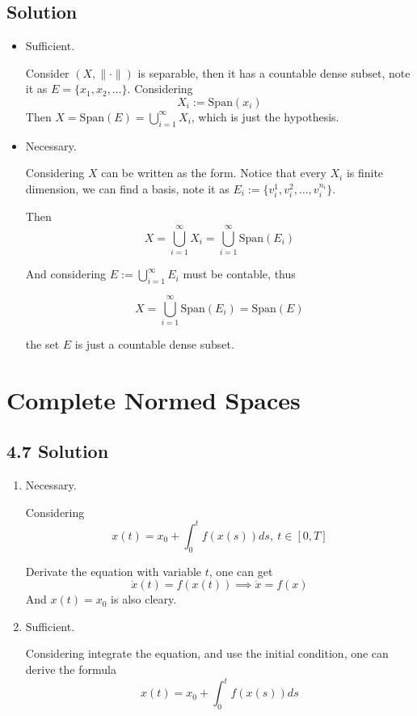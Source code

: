 \documentclass{article}
\begin{document}
\subsection{Solution}

\begin{itemize}
    \item Sufficient.
    
    Consider \((X, \|\cdot\|)\) is separable, then it has a countable dense subset, note it as \(E = \{x_1, x_2, \ldots\}\). Considering 
    \[X_i := \mathrm{Span}(x_i)\]
    Then \(X = \mathrm{Span}(E) = \bigcup_{i = 1}^\infty X_i\), which is just the hypothesis.

    \item Necessary.
    
    Considering \(X\) can be written as the form. Notice that every \(X_i\) is finite dimension, we can find a basis, note it as \(E_i := \{v_i^1, v_i^2, \ldots, v_i^{n_i}\}\). 
    
    Then
    \[X = \bigcup_{i = 1}^\infty X_i = \bigcup_{i = 1}^\infty \mathrm{Span}(E_i)\]

    And considering \(E := \bigcup_{i = 1}^\infty E_i\) must be contable, thus

    \[X = \bigcup_{i = 1}^\infty \mathrm{Span}(E_i) = \mathrm{Span}(E)\]

    the set \(E\) is just a countable dense subset.
\end{itemize}

\section{Complete Normed Spaces}

\subsection*{4.7 Solution}
\begin{enumerate}
    \item Necessary.
    
    Considering
    \[x(t) = x_0 + \int_0^t f(x(s)) ds,\ t \in [0, T]\]

    Derivate the equation with variable \(t\), one can get 
    \[\dot x(t) = f(x(t)) \implies \dot x = f(x)\]
    And \(x(t) = x_0\) is also cleary.

    \item Sufficient.
    
    Considering integrate the equation, and use the initial condition, one can derive the formula
    \[x(t) = x_0 + \int_{0}^t f(x(s)) ds\]
\end{enumerate}
\end{document}

